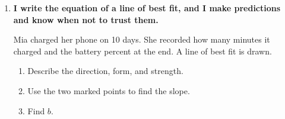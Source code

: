 \documentclass[11pt]{article}
\newcommand{\goal}[1]{\textbf{#1}\par\vspace{0.35em}}
\begin{document}
\begin{enumerate}
\begin{minipage}[t]{0.42\linewidth}
\begin{enumerate}[start=4,itemsep=0.9em]
\end{enumerate}
\end{minipage}

\vspace{0.8em}
\begin{minipage}[t]{0.56\linewidth}\vspace{0pt}\raggedright
{}
\end{minipage}\hfill
\begin{minipage}[t]{0.42\linewidth}\vspace{0pt}\raggedright
\begin{enumerate}[start=7]
  \item Ken drew this line for the same data. It goes through the first dot and the last dot. Is it a good line of best fit? Explain.

\end{enumerate}
\end{minipage}

\newpage
\item \goal{I write the equation of a line of best fit, and I make predictions and know when not to trust them.}
Mia charged her phone on 10 days. She recorded how many minutes it charged and the battery percent at the end. A line of best fit is drawn.

\vspace{0.4em}
\begin{minipage}[t]{0.53\linewidth}\vspace{0pt}\raggedright
{}
\end{minipage}\hfill
\begin{minipage}[t]{0.44\linewidth}\vspace{0pt}\raggedright
\begin{enumerate}[itemsep=1.2em]
  \item Describe the direction, form, and strength.

  \work{1.5em}
  \item Use the two marked points to find the slope.

  \work{3em}
  \item Find $b$.

  \work{3em}
\end{enumerate}
\end{minipage}


\end{enumerate}
\end{document}
